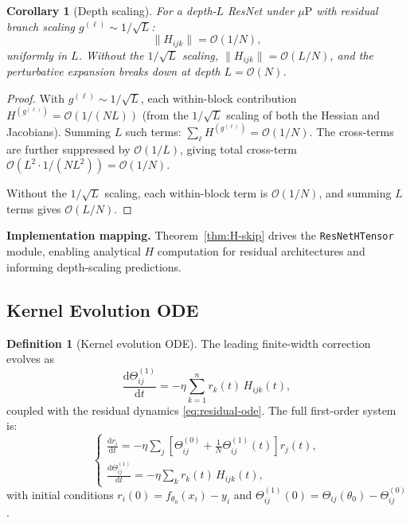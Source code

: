 \documentclass[11pt]{article}
\newtheorem{corollary}[theorem]{Corollary}
\theoremstyle{definition}
\newtheorem{definition}[theorem]{Definition}
\newcommand{\cO}{\mathcal{O}}
\newcommand{\muP}{\mu\text{P}}
\newcommand{\norm}[1]{\lVert #1 \rVert}
\newcommand{\dd}{\mathrm{d}}
\renewcommand{\Theta}{\varTheta}
\begin{document}
\begin{corollary}[Depth scaling]
\label{cor:depth-scaling}
For a depth-$L$ ResNet under $\muP$ with residual branch scaling $g^{(\ell)} \sim 1/\sqrt{L}$:
\begin{equation}
\norm{H_{ijk}} = \cO(1/N),
\end{equation}
uniformly in $L$. Without the $1/\sqrt{L}$ scaling, $\norm{H_{ijk}} = \cO(L/N)$, and the perturbative expansion breaks down at depth $L = \cO(N)$.
\end{corollary}

\begin{proof}
With $g^{(\ell)} \sim 1/\sqrt{L}$, each within-block contribution $H^{(g^{(\ell)})} = \cO(1/(NL))$ (from the $1/\sqrt{L}$ scaling of both the Hessian and Jacobians). Summing $L$ such terms: $\sum_\ell H^{(g^{(\ell)})} = \cO(1/N)$. The cross-terms are further suppressed by $\cO(1/L)$, giving total cross-term $\cO(L^2 \cdot 1/(NL^2)) = \cO(1/N)$.

Without the $1/\sqrt{L}$ scaling, each within-block term is $\cO(1/N)$, and summing $L$ terms gives $\cO(L/N)$.
\end{proof}

\textbf{Implementation mapping.} Theorem~\ref{thm:H-skip} drives the \texttt{ResNetHTensor} module, enabling analytical $H$ computation for residual architectures and informing depth-scaling predictions.

\subsection{Kernel Evolution ODE}
\label{sec:kernel-ode}

\begin{definition}[Kernel evolution ODE]
\label{def:kernel-ode}
The leading finite-width correction evolves as
\begin{equation}
\label{eq:kernel-ode}
\frac{\dd \Theta^{(1)}_{ij}}{\dd t} = -\eta \sum_{k=1}^n r_k(t)\, H_{ijk}(t),
\end{equation}
coupled with the residual dynamics \eqref{eq:residual-ode}. The full first-order system is:
\begin{equation}
\label{eq:coupled-system}
\begin{cases}
\displaystyle\frac{\dd r_i}{\dd t} = -\eta \sum_j \left[\Theta^{(0)}_{ij} + \frac{1}{N}\Theta^{(1)}_{ij}(t)\right] r_j(t), \\[10pt]
\displaystyle\frac{\dd \Theta^{(1)}_{ij}}{\dd t} = -\eta \sum_k r_k(t)\, H_{ijk}(t),
\end{cases}
\end{equation}
with initial conditions $r_i(0) = f_{\theta_0}(x_i) - y_i$ and $\Theta^{(1)}_{ij}(0) = \Theta_{ij}(\theta_0) - \Theta^{(0)}_{ij}$.
\end{definition}
\end{document}
